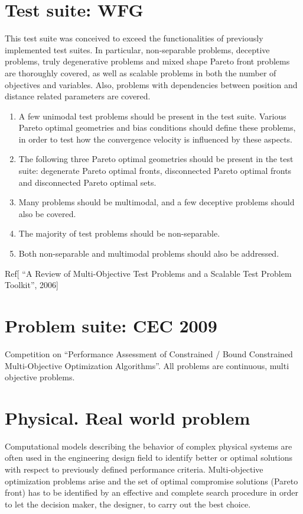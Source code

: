 \section{Test suite: WFG}
This test suite was conceived to exceed the functionalities of previously implemented test suites.
In particular, non-separable problems, deceptive problems, truly degenerative problems and mixed shape Pareto front problems are thoroughly covered, 
as well as scalable problems in both the number of objectives and variables. Also, problems with dependencies between position and distance related parameters are covered.
    \begin{enumerate}

        \item A few unimodal test problems should be present in the test suite. 
        Various Pareto optimal geometries and bias conditions should define these problems, 
        in order to test how the convergence velocity is influenced by these aspects.

        \item The following three Pareto optimal geometries should be present in the test suite: 
        degenerate Pareto optimal fronts, disconnected Pareto optimal fronts and disconnected Pareto optimal sets.

        \item Many problems should be multimodal, and a few deceptive problems should also be covered.
        \item The majority of test problems should be non-separable.
        \item Both non-separable and multimodal problems should also be addressed.
    \end{enumerate}
Ref[ “A Review of Multi-Objective Test Problems and a Scalable Test Problem Toolkit”, 2006]

\section{Problem suite: CEC 2009}
Competition on “Performance Assessment of Constrained / Bound Constrained Multi-Objective Optimization Algorithms”. All problems are continuous, multi objective problems.

\section{Physical. Real world problem}

    Computational models describing the behavior of complex physical systems are often used in 
    the engineering design field to identify better or optimal solutions with respect to previously 
    defined performance criteria. Multi-objective optimization problems arise and the set of optimal compromise 
    solutions (Pareto front) has to be identified by an effective and complete search procedure in order to let the 
    decision maker, the designer, to carry out the best choice.

